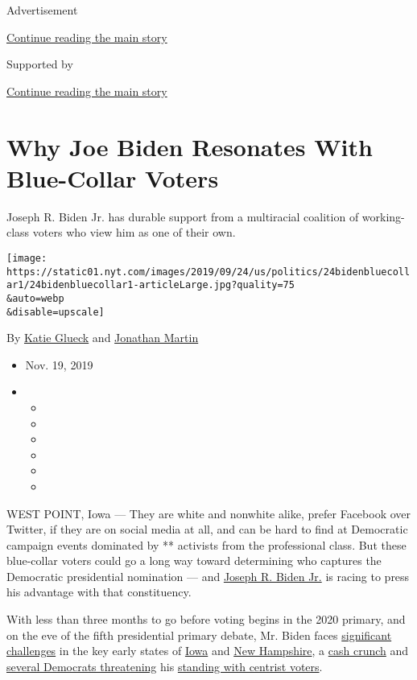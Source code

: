 Advertisement

\protect\hyperlink{after-top}{Continue reading the main story}

Supported by

\protect\hyperlink{after-sponsor}{Continue reading the main story}

\hypertarget{why-joe-biden-resonates-with-blue-collar-voters}{%
\section{Why Joe Biden Resonates With Blue-Collar
Voters}\label{why-joe-biden-resonates-with-blue-collar-voters}}

Joseph R. Biden Jr. has durable support from a multiracial coalition of
working-class voters who view him as one of their own.

\texttt{[image: https://static01.nyt.com/images/2019/09/24/us/politics/24bidenbluecollar1/24bidenbluecollar1-articleLarge.jpg?quality=75\\\&auto=webp\\\&disable=upscale]}

By \href{https://www.nytimes.com/by/katie-glueck}{Katie Glueck} and
\href{https://www.nytimes.com/by/jonathan-martin}{Jonathan Martin}

\begin{itemize}
\item
  Nov. 19, 2019
\item
  \begin{itemize}
  \item
  \item
  \item
  \item
  \item
  \item
  \end{itemize}
\end{itemize}

WEST POINT, Iowa --- They are white and nonwhite alike, prefer Facebook
over Twitter, if they are on social media at all, and can be hard to
find at Democratic campaign events dominated by ** activists from the
professional class. But these blue-collar voters could go a long way
toward determining who captures the Democratic presidential nomination
--- and
\href{https://www.nytimes.com/interactive/2020/us/elections/joe-biden.html}{Joseph
R. Biden Jr.} is racing to press his advantage with that constituency.

With less than three months to go before voting begins in the 2020
primary, and on the eve of the fifth presidential primary debate, Mr.
Biden faces
\href{https://www.nytimes.com/2019/11/16/us/politics/iowa-poll-democrats.html}{significant
challenges} in the key early states of
\href{https://www.nytimes.com/2019/08/22/us/politics/joe-biden-trump-2020.html}{Iowa}
and
\href{https://www.realclearpolitics.com/epolls/2020/president/nh/new_hampshire_democratic_presidential_primary-6276.html\#polls}{New
Hampshire}, a
\href{https://www.nytimes.com/2019/10/16/us/politics/democratic-fundraising-joe-biden.html}{cash
crunch} and
\href{https://www.nytimes.com/2019/11/15/us/politics/deval-patrick-michael-bloomberg-2020.html}{several
Democrats threatening} his
\href{https://www.nytimes.com/2019/11/04/us/politics/pete-buttigieg-iowa.html}{standing
with centrist voters}.

